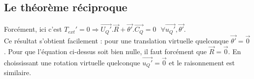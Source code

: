 \subsection{Le théorème réciproque}
Forcément, ici c'est $T_{ext}' = 0 \Rightarrow \vec{U_Q'}.\vec{R} + 
\vec{\theta'}.\vec{C_Q} = 0\ \ \ \forall \vec{u_Q'},\vec{\theta'}$.\\
Ce résultat s'obtient facilement : pour une translation virtuelle 
quelconque $\vec{\theta'}=\vec 0$. Pour que l'équation ci-dessus soit bien nulle,
il faut forcément que $\vec{R}=\vec{0}$. En choississant une rotation
virtuelle quelconque $\vec{u_Q'}=\vec{0}$ et le raisonnement est similaire.
	
	
	
	
	
	
	
	
	
	
	
	
	
	
	
	
	
	
	
	
	
	
